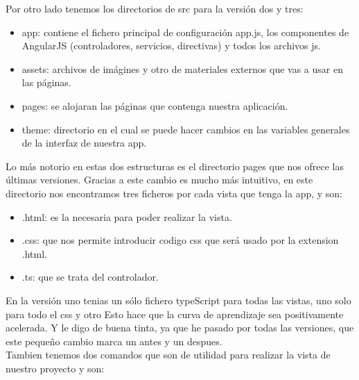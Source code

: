 \documentclass[a4paper, 11pt]{article}
\begin{document}
\begin{itemize}
            Por otro lado tenemos los directorios de src para la versión dos y tres:

            \begin{itemize}
                  \item{app: contiene el fichero principal de configuración app.js,
                        los componentes de AngularJS (controladores, servicios,
                        directivas) y todos los archivos js.}
                  \item{assets: archivos de imágines y otro de materiales externos
                        que vas a usar en las páginas.}
                  \item{pages: se alojaran las páginas que contenga nuestra
                        aplicación.}
                  \item{theme: directorio en el cual se puede hacer cambios en las
                        variables generales de la interfaz de nuestra app.}
            \end{itemize}

            Lo más notorio en estas dos estructuras es el directorio pages que nos
            ofrece las últimas versiones. Gracias a este cambio es mucho más
            intuitivo, en este directorio nos encontramos tres ficheros por cada
            vista que tenga la app, y son:

            \begin{itemize}
                \item{.html: es la necesaria para poder realizar la vista.}
                \item{.css: que nos permite introducir codigo css que será usado por
                       la extension .html.}
                \item{.ts: que se trata del controlador.}
            \end{itemize}

            En la versión uno tenias un sólo fichero typeScript para todas las
            vistas, uno solo para todo el css y otro
            Esto hace que la curva de aprendizaje sea positivamente acelerada.
            Y le digo de buena tinta, ya que he pasado por todas las versiones,
            que este pequeño cambio marca un antes y un despues.\\



            Tambien tenemos dos comandos que son de utilidad para realizar la
            vista de nuestro proyecto y son:


\end{itemize}
\end{document}
